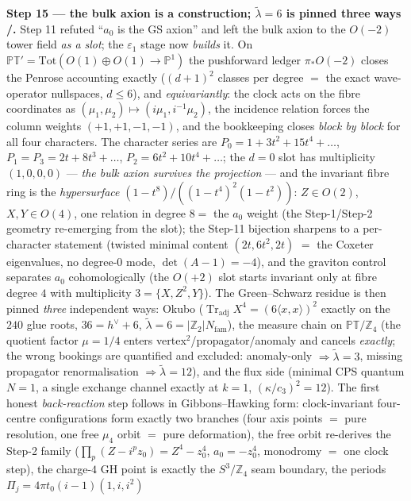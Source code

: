 \documentclass[11pt,a4paper]{article}
\newcommand{\cthree}{c_3}
\newcommand{\Z}{\mathbb{Z}}
\theoremstyle{definition}
\begin{document}
\par\smallskip\noindent\textbf{Step 15 --- the bulk axion is a construction; $\tilde\lambda=6$ is
pinned three ways \mE/\mC.} Step 11 refuted ``$a_0$ is the GS axion'' and left the bulk axion to
the $O(-2)$ tower field \emph{as a slot}; the $\varepsilon_1$ stage now \emph{builds} it. On
$\mathbb{PT}'=\mathrm{Tot}(O(1){\oplus}O(1)\to\mathbb P^1)$ the pushforward ledger $\pi_*O(-2)$
closes the Penrose accounting exactly ($(d{+}1)^2$ classes per degree $=$ the exact wave-operator
nullspaces, $d\le6$), and \emph{equivariantly}: the clock acts on the fibre coordinates as
$(\mu_1,\mu_2)\mapsto(i\mu_1,i^{-1}\mu_2)$, the incidence relation forces the column weights
$(+1,+1,-1,-1)$, and the bookkeeping closes \emph{block by block} for all four characters. The
character series are $P_0=1+3t^2+15t^4+\dots$, $P_1=P_3=2t+8t^3+\dots$, $P_2=6t^2+10t^4+\dots$;
the $d=0$ slot has multiplicity $(1,0,0,0)$ --- \emph{the bulk axion survives the projection} ---
and the invariant fibre ring is the \emph{hypersurface} $(1-t^8)/((1-t^4)^2(1-t^2))$: $Z\in O(2)$,
$X,Y\in O(4)$, one relation in degree $8=$ the $a_0$ weight (the Step-1/Step-2 geometry
re-emerging from the slot); the Step-11 bijection sharpens to a per-character statement (twisted
minimal content $(2t,6t^2,2t)$ $=$ the Coxeter eigenvalues, no degree-$0$ mode,
$\det(A-1)=-4$), and the graviton control separates $a_0$ cohomologically (the $O(+2)$ slot
starts invariant only at fibre degree $4$ with multiplicity $3=\{X,Z^2,Y\}$). The Green--Schwarz
residue is then pinned \emph{three} independent ways: Okubo
($\operatorname{Tr}_{\mathrm{adj}}X^4=(6\langle x,x\rangle)^2$ exactly on the $240$ glue roots,
$36=h^\vee+6$, $\tilde\lambda=6=|\Z_2|N_{\mathrm{fam}}$), the measure chain on $\mathbb{PT}/\Z_4$
(the quotient factor $\mu=1/4$ enters vertex$^2$/propagator/anomaly and cancels \emph{exactly};
the wrong bookings are quantified and excluded: anomaly-only $\Rightarrow\tilde\lambda=3$,
missing propagator renormalisation $\Rightarrow\tilde\lambda=12$), and the flux side (minimal
CPS quantum $N=1$, a single exchange channel exactly at $k=1$, $(\kappa/\cthree)^2=12$). The
first honest \emph{back-reaction} step follows in Gibbons--Hawking form: clock-invariant
four-centre configurations form exactly two branches (four axis points $=$ pure resolution, one
free $\mu_4$ orbit $=$ pure deformation), the free orbit re-derives the Step-2 family
($\prod_p(Z-i^pz_0)=Z^4-z_0^4$, $a_0=-z_0^4$, monodromy $=$ one clock step), the charge-$4$ GH
point is exactly the $S^3/\Z_4$ seam boundary, the periods $\Pi_j=4\pi t_0(i-1)(1,i,i^2)$
\end{document}
